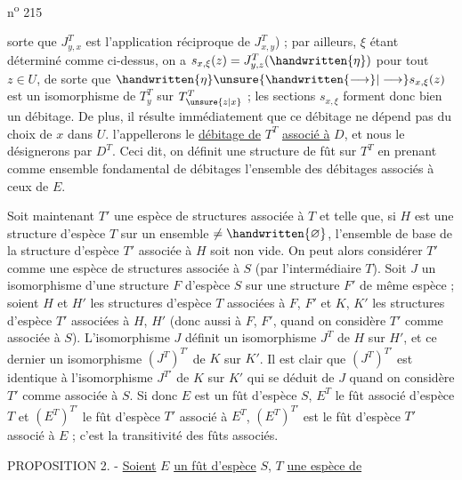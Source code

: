 n\textsuperscript{o} 215

sorte que $J^T_{y,x}$ est l'application réciproque de $J^T_{x,y}$) ; par ailleurs, $\xi$ étant déterminé comme ci-dessus, on a $s_{x,\xi}(z)=J^T_{y,z}(\handwritten{\eta})$ pour tout $z\in U$, de sorte que $\handwritten{\eta}\unsure{\handwritten{\longrightarrow}|\longrightarrow} s_{x,\xi}(z)$ est un isomorphisme de $T_y^T$ sur $T_{\unsure{z|x}}^T$ ; les sections $s_{x,\xi}$ forment donc bien un débitage. De plus, il résulte immédiatement que ce débitage ne dépend pas du choix de $x$ dans $U$.  l'appellerons le \uline{débitage de} $T^T$ \uline{associé à} $D$, et nous le désignerons par $D^T$. Ceci dit, on définit une structure de fût sur $T^T$ en prenant comme ensemble fondamental de débitages l'ensemble des débitages associés à ceux de $E$.

Soit maintenant $T'$ une espèce de structures associée à $T$ et telle que, si $H$ est une structure d'espèce $T$ sur un ensemble $\ne\handwritten{\varnothing}$, l'ensemble de base de la structure d'espèce $T'$ associée à $H$ soit non vide. On peut alors considérer $T'$ comme une espèce de structures associée à $S$ (par l'intermédiaire  $T$). Soit $J$ un isomorphisme d'une structure $F$ d'espèce $S$ sur une structure $F'$ de même espèce ; soient $H$ et $H'$ les structures d'espèce $T$ associées à $F$, $F'$ et $K$, $K'$ les structures d'espèce $T'$ associées à $H$, $H'$ (donc aussi à $F$, $F'$, quand on considère $T'$ comme associée à $S$). L'isomorphisme $J$ définit un isomorphisme $J^T$ de $H$ sur $H'$, et ce dernier un isomorphisme $(J^T)^{T'}$ de $K$ sur $K'$. Il est clair que $(J^T)^{T'}$ est identique à l'isomorphisme $J^{T'}$ de $K$ sur $K'$ qui se déduit de $J$ quand on considère $T'$ comme associée à $S$. Si donc $E$ est un fût d'espèce $S$, $E^T$ le fût associé d'espèce $T$ et $(E^T)^{T'}$ le fût d'espèce $T'$ associé à $E^T$, $(E^T)^{T'}$ est le fût d'espèce $T'$ associé à $E$ ; c'est la transitivité des fûts associés.

PROPOSITION 2. - \uline{Soient} $E$ \uline{un fût d'espèce} $S$, $T$ \uline{une espèce de}

